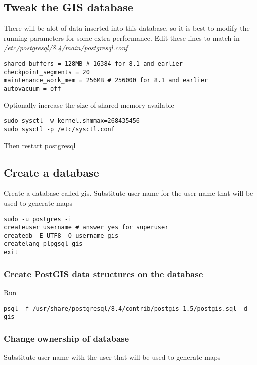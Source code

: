 \subsection{Tweak the GIS database}

There will be alot of data inserted into this database, so it is best to modify the running parameters for some extra performance. Edit these lines to match in \emph{/etc/postgresql/8.4/main/postgresql.conf}

\begin{verbatim}
shared_buffers = 128MB # 16384 for 8.1 and earlier
checkpoint_segments = 20
maintenance_work_mem = 256MB # 256000 for 8.1 and earlier
autovacuum = off
\end{verbatim}

Optionally increase the size of shared memory available

\begin{verbatim}
sudo sysctl -w kernel.shmmax=268435456
sudo sysctl -p /etc/sysctl.conf
\end{verbatim}

Then restart postgresql

\subsection{Create a database}

Create a database called gis. Substitute user-name for the user-name that will be used to generate maps
\begin{verbatim}
sudo -u postgres -i
createuser username # answer yes for superuser
createdb -E UTF8 -O username gis
createlang plpgsql gis
exit
\end{verbatim}

\subsubsection{Create PostGIS data structures on the database}

Run
\begin{verbatim}
psql -f /usr/share/postgresql/8.4/contrib/postgis-1.5/postgis.sql -d gis
\end{verbatim}

\subsubsection{Change ownership of database}

Substitute user-name with the user that will be used to generate maps

